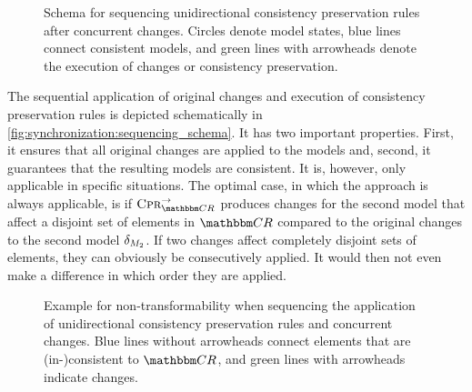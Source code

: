 \begin{figure}
    \centering
    
    \caption[Sequencing unidirectional consistency preservation rules]{Schema for sequencing unidirectional consistency preservation rules after concurrent changes. Circles denote model states, blue lines connect consistent models, and green lines with arrowheads denote the execution of changes or consistency preservation.}
    \label{fig:synchronization:sequencing_schema}
\end{figure}

The sequential application of original changes and execution of consistency preservation rules is depicted schematically in \autoref{fig:synchronization:sequencing_schema}.
It has two important properties. 
First, it ensures that all original changes are applied to the models and, second, it guarantees that the resulting models are consistent.
It is, however, only applicable in specific situations.
The optimal case, in which the approach is always applicable, is if $\consistencypreservationrule{\consistencyrelationset{CR}}^{\rightarrow}$ produces changes for the second model that affect a disjoint set of elements in $\consistencyrelationset{CR}$ compared to the original changes to the second model $\change{\metamodel{M}{2}}$.
If two changes affect completely disjoint sets of elements, they can obviously be consecutively applied.
It would then not even make a difference in which order they are applied.

\begin{figure}
    \centering
    
    \caption[Non-transformability in sequencing scenario]{Example for non-transformability when sequencing the application of unidirectional consistency preservation rules and concurrent changes.
    Blue lines without arrowheads connect elements that are \mbox{(in-)}consistent to $\consistencyrelationset{CR}$, and green lines with arrowheads indicate changes.}
    \label{fig:synchronization:non_transformability}
\end{figure}

